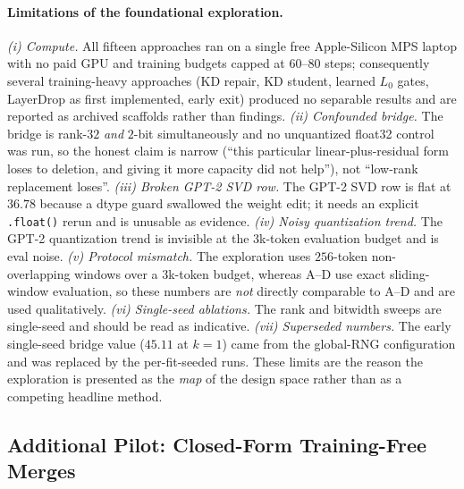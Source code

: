 \documentclass[10pt,a4paper]{article}
\begin{document}
\paragraph{Limitations of the foundational exploration.}
\emph{(i) Compute.} All fifteen approaches ran on a single free Apple-Silicon
MPS laptop with no paid GPU and training budgets capped at $60$--$80$ steps;
consequently several training-heavy approaches (KD repair, KD student, learned
$L_0$ gates, LayerDrop as first implemented, early exit) produced no separable
results and are reported as archived scaffolds rather than findings.
\emph{(ii) Confounded bridge.} The bridge is rank-$32$ \emph{and} $2$-bit
simultaneously and no unquantized float32 control was run, so the honest
claim is narrow (``this particular linear-plus-residual form loses to deletion,
and giving it more capacity did not help''), not ``low-rank replacement loses''.
\emph{(iii) Broken GPT-2 SVD row.} The GPT-2 SVD row is flat at $36.78$ because a
dtype guard swallowed the weight edit; it needs an explicit \texttt{.float()}
rerun and is unusable as evidence. \emph{(iv) Noisy quantization trend.} The
GPT-2 quantization trend is invisible at the $3$k-token evaluation budget and is
eval noise. \emph{(v) Protocol mismatch.} The exploration uses $256$-token
non-overlapping windows over a $3$k-token budget, whereas A--D use exact
sliding-window evaluation, so these numbers are \emph{not} directly comparable to
A--D and are used qualitatively. \emph{(vi) Single-seed ablations.} The rank and
bitwidth sweeps are single-seed and should be read as indicative. \emph{(vii)
Superseded numbers.} The early single-seed bridge value ($45.11$ at $k{=}1$) came
from the global-RNG configuration and was replaced by the per-fit-seeded runs.
These limits are the reason the exploration is presented as the \emph{map} of the
design space rather than as a competing headline method.

\subsection{Additional Pilot: Closed-Form Training-Free Merges}
\label{sec:pilot}
\end{document}
